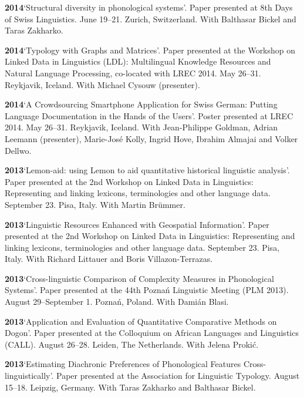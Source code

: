 \documentclass[11pt]{article}
\newcommand{\hangpara}{
 \setlength{\parindent}{0in} %
 \hangindent=0.42in %
}
\begin{document}
\vskip 6pt
\hangpara
{\bf 2014}\hspace{1ex}`Structural diversity in phonological systems'. Paper presented at 8th Days of Swiss Linguistics. June 19--21. Zurich, Switzerland. With Balthasar Bickel and Taras Zakharko.

\vskip 6pt
\hangpara
{\bf 2014}\hspace{1ex}`Typology with Graphs and Matrices'. Paper presented at the Workshop on Linked Data in Linguistics (LDL): Multilingual Knowledge Resources and Natural Language Processing, co-located with LREC 2014. May 26--31. Reykjavik, Iceland. With Michael Cysouw (presenter).

\vskip 6pt
\hangpara
{\bf 2014}\hspace{1ex}`A Crowdsourcing Smartphone Application for Swiss German: Putting Language Documentation in the Hands of the Users'. Poster presented at LREC 2014. May 26--31. Reykjavik, Iceland. With Jean-Philippe Goldman, Adrian Leemann (presenter), Marie-Jos{\'e} Kolly, Ingrid Hove, Ibrahim Almajai and Volker Dellwo.

\vskip 6pt
\hangpara
{\bf 2013}\hspace{1ex}`Lemon-aid: using Lemon to aid quantitative historical linguistic analysis'. Paper presented at the 2nd Workshop on Linked Data in Linguistics: Representing and linking lexicons, terminologies and other language data. September 23. Pisa, Italy. With Martin Brümmer. 

\vskip 6pt
\hangpara
{\bf 2013}\hspace{1ex}`Linguistic Resources Enhanced with Geospatial Information'. Paper presented at the 2nd Workshop on Linked Data in Linguistics: Representing and linking lexicons, terminologies and other language data. September 23. Pisa, Italy. With Richard Littauer and Boris Villazon-Terrazas.

\vskip 6pt
\hangpara
{\bf 2013}\hspace{1ex}`Cross-linguistic Comparison of Complexity Measures in Phonological Systems'. Paper presented at the 44th Pozna{\'n} Linguistic Meeting (PLM 2013). August 29--September 1. Pozna{\'n}, Poland. With Dami{\'a}n Blasi.

\vskip 6pt
\hangpara
{\bf 2013}\hspace{1ex}`Application and Evaluation of Quantitative Comparative Methods on Dogon'. Paper presented at the Colloquium on African Languages and Linguistics (CALL). August 26--28. Leiden, The Netherlands. With Jelena Proki{\'c}.

\vskip 6pt
\hangpara
{\bf 2013}\hspace{1ex}`Estimating Diachronic Preferences of Phonological Features Cross-linguistically'. Paper presented at the Association for Linguistic Typology. August 15--18. Leipzig, Germany. With Taras Zakharko and Balthasar Bickel.
\end{document}
